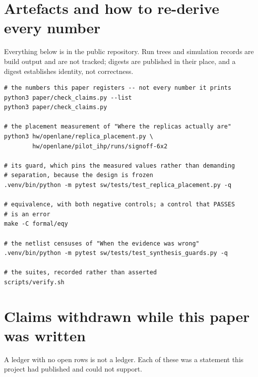 \documentclass[11pt,a4paper]{article}
\begin{document}
\appendix

\section{Artefacts and how to re-derive every number}
\label{app:artefacts}

Everything below is in the public repository. Run trees and simulation
records are build output and are not tracked; digests are published in
their place, and a digest establishes identity, not correctness.

\begin{verbatim}
# the numbers this paper registers -- not every number it prints
python3 paper/check_claims.py --list
python3 paper/check_claims.py

# the placement measurement of "Where the replicas actually are"
python3 hw/openlane/replica_placement.py \
        hw/openlane/pilot_ihp/runs/signoff-6x2

# its guard, which pins the measured values rather than demanding
# separation, because the design is frozen
.venv/bin/python -m pytest sw/tests/test_replica_placement.py -q

# equivalence, with both negative controls; a control that PASSES
# is an error
make -C formal/eqy

# the netlist censuses of "When the evidence was wrong"
.venv/bin/python -m pytest sw/tests/test_synthesis_guards.py -q

# the suites, recorded rather than asserted
scripts/verify.sh
\end{verbatim}

\section{Claims withdrawn while this paper was written}
\label{app:withdrawn}

A ledger with no open rows is not a ledger. Each of these was a
statement this project had published and could not support.
\end{document}
